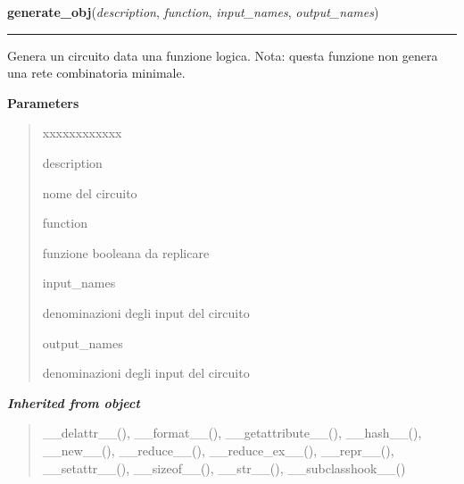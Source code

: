 \hspace{.8\funcindent}\begin{boxedminipage}{\funcwidth}

    \raggedright \textbf{generate\_obj}(\textit{description}, \textit{function}, \textit{input\_names}, \textit{output\_names})

    \vspace{-1.5ex}

    \rule{\textwidth}{0.5\fboxrule}
\setlength{\parskip}{2ex}
    Genera un circuito data una funzione logica. Nota: questa funzione non 
    genera una rete combinatoria minimale.

\setlength{\parskip}{1ex}
      \textbf{Parameters}
      \vspace{-1ex}

      \begin{quote}
        \begin{Ventry}{xxxxxxxxxxxx}

          \item[description]

          nome del circuito

          \item[function]

          funzione booleana da replicare

          \item[input\_names]

          denominazioni degli input del circuito

          \item[output\_names]

          denominazioni degli input del circuito

        \end{Ventry}

      \end{quote}

    \end{boxedminipage}


\large{\textbf{\textit{Inherited from object}}}

\begin{quote}
\_\_delattr\_\_(), \_\_format\_\_(), \_\_getattribute\_\_(), \_\_hash\_\_(), \_\_new\_\_(), \_\_reduce\_\_(), \_\_reduce\_ex\_\_(), \_\_repr\_\_(), \_\_setattr\_\_(), \_\_sizeof\_\_(), \_\_str\_\_(), \_\_subclasshook\_\_()
\end{quote}


